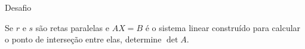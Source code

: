 \begin{exercicios}{Desafio}
    
    \begin{exercicio}
        Se $r$ e $s$ são retas paralelas e $AX=B$ é o sistema linear construído para 
        calcular o ponto de interseção entre elas, determine $\det A$.
    \end{exercicio}
    
\end{exercicios}

